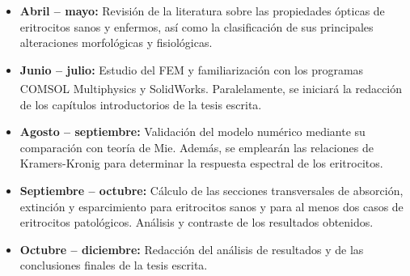 \documentclass[11pt,letterpaper]{article}
\begin{document}
	\begin{itemize} 
		\item \textbf{Abril – mayo:} Revisión de la literatura sobre las propiedades ópticas de eritrocitos sanos y enfermos, así como la clasificación de sus principales alteraciones morfológicas y fisiológicas.
		\item \textbf{Junio – julio:} Estudio del FEM y familiarización con los programas COMSOL Multiphysics\textsuperscript{\texttrademark} y SolidWorks. Paralelamente, se iniciará la redacción de los capítulos introductorios de la tesis escrita.
		
		\item \textbf{Agosto – septiembre:} Validación del modelo numérico mediante su comparación con teoría de Mie. Además, se emplearán las relaciones de Kramers-Kronig para determinar la respuesta espectral de los eritrocitos. 
		
		\item \textbf{Septiembre – octubre:} Cálculo de las secciones transversales de absorción, extinción y esparcimiento para eritrocitos sanos y para al menos dos casos de eritrocitos patológicos. Análisis y contraste de los resultados obtenidos.
		
		\item \textbf{Octubre – diciembre:} Redacción del análisis de resultados y de las conclusiones finales de la tesis escrita.
	\end{itemize}
	
\end{document}
